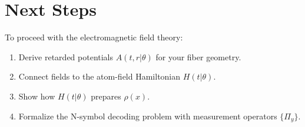 \documentclass[12pt, a4paper]{article}
\begin{document}
\section{Next Steps}
To proceed with the electromagnetic field theory:
\begin{enumerate}
    \item Derive retarded potentials $A(t,r|\theta)$ for your fiber geometry.
    \item Connect fields to the atom-field Hamiltonian $H(t|\theta)$.
    \item Show how $H(t|\theta)$ prepares $\rho(x)$.
    \item Formalize the N-symbol decoding problem with measurement operators $\{\Pi_{y}\}$.
\end{enumerate}
\end{document}

